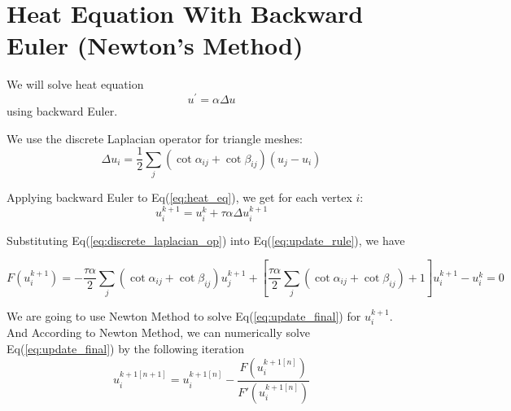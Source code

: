 \documentclass{article}
\begin{document}
\section*{Heat Equation With Backward Euler (Newton's Method)}
We will solve heat equation 
\begin{equation} \label{eq:heat_eq}
u^{\prime} = \alpha \Delta u
\end{equation}
using backward Euler. 

We use the discrete Laplacian operator for triangle meshes:
\begin{equation} \label{eq:discrete_laplacian_op}
\Delta u_i = \frac{1}{2}\sum_{j} (\cot{\alpha_{ij}} + \cot{\beta_{ij}})(u_j - u_i)
\end{equation}

Applying backward Euler to Eq(\ref{eq:heat_eq}), we get for each vertex $i$:
\begin{equation} \label{eq:update_rule}
u_i^{k+1} = u_i^{k} + \tau \alpha \Delta u_i^{k+1}
\end{equation}

Substituting Eq(\ref{eq:discrete_laplacian_op}) into Eq(\ref{eq:update_rule}), we have

\begin{equation} \label{eq:update_final}
F(u_i^{k+1}) = -\frac{\tau\alpha}{2} \sum_{j}(\cot \alpha_{ij} + \cot \beta_{ij}) u_j^{k+1} + \left[\frac{\tau\alpha}{2}\sum_{j}(\cot \alpha_{ij} + \cot \beta_{ij}) + 1\right]u_i^{k+1}  - u_i^k = 0
\end{equation}

We are going to use Newton Method to solve Eq(\ref{eq:update_final}) for $u_i^{k+1}$.
And According to Newton Method, we can numerically solve Eq({\ref{eq:update_final}}) by the following iteration
\begin{equation} \label{eq:newton_iter}
	u_i^{{k+1}[n+1]} = 	u_i^{{k+1}[n]} - \frac{F(u_i^{{k+1}[n]})}{F'(u_i^{{k+1}[n]})}
\end{equation}
\end{document}
